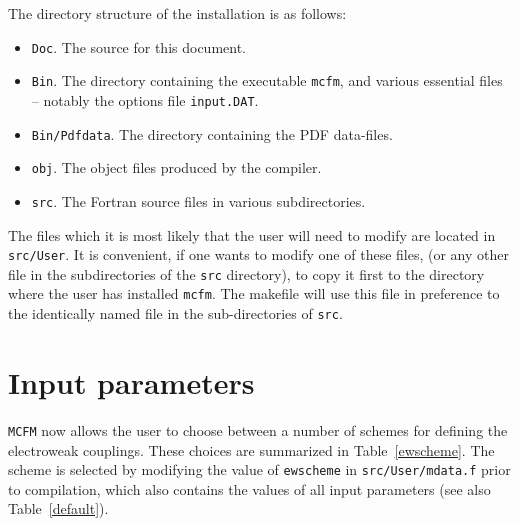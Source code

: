 \documentclass[12pt]{article}
\begin{document}
The directory structure of the installation is as follows:
\begin{itemize}
\item {\tt Doc}. The source for this document.
\item {\tt Bin}. The directory containing the executable {\tt mcfm},
and various essential files -- notably the options file {\tt input.DAT}.
\item {\tt Bin/Pdfdata}. The directory containing the PDF data-files.
\item {\tt obj}. The object files produced by the compiler. 
\item {\tt src}. The Fortran source files in various subdirectories.
\end{itemize}
The files which it is most likely that the user will need to modify
are located in {\tt src/User}. It is convenient, if one wants to 
modify one of these files, (or any other file in the subdirectories of the 
{\tt src} directory),
to copy it first to the directory where the user has installed {\tt mcfm}.
The makefile will use this file in preference to the identically named
file in the sub-directories of {\tt src}.
 
\section{Input parameters}

{\tt MCFM} now allows the user to choose between a number of schemes
for defining the electroweak couplings. These choices are summarized
in Table~\ref{ewscheme}. The scheme is selected by modifying the
value of {\tt ewscheme} in {\tt src/User/mdata.f} prior to compilation, 
which also contains
the values of all input parameters (see also Table~\ref{default}).
\end{document}
